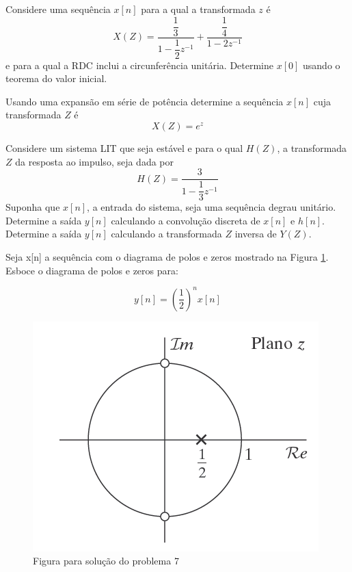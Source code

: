 \documentclass[12pt,a4paper]{article}
\begin{document}
\answer

\problem Considere uma sequência $x[n]$ para a qual a transformada
$z$ é
\begin{equation}
    X(Z) = \dfrac{\dfrac{1}{3}}{1 - \dfrac{1}{2}z^{-1}} + \dfrac{\dfrac{1}{4}}{1 - 2z^{-1}}
\end{equation}
e para a qual a RDC inclui a circunferência unitária. Determine
$x[0]$ usando o teorema do valor inicial.

\answer

\problem Usando uma expansão em série de potência determine a sequência $x[n]$ cuja transformada $Z$ é
\begin{equation}
X(Z) = e^{z}    
\end{equation}

\answer

\problem Considere um sistema LIT que seja estável e para o
qual $H(Z)$, a transformada $Z$ da resposta ao impulso,
seja dada por
\begin{equation}
    H(Z) = \dfrac{3}{1 - \dfrac{1}{3}z^{-1}}
\end{equation}
Suponha que $x[n]$, a entrada do sistema, seja uma sequência
degrau unitário.
\subproblem Determine a saída $y[n]$ calculando a convolução
discreta de $x[n]$ e $h[n]$.
\subproblem Determine a saída $y[n]$ calculando a transformada
$Z$ inversa de $Y(Z)$.

\answer

\problem Seja x[n] a sequência com o diagrama de polos e zeros
mostrado na Figura \ref{fig7}. Esboce o diagrama de polos e zeros para:

\begin{equation}
    y[n] = \left(\dfrac{1}{2}\right)^n x[n]
\end{equation}
\begin{figure}[h!]
    \centering
    \includegraphics[scale=0.6]{Fig/fig7.png}
    \caption{Figura para solução do problema 7}
    \label{fig7}
\end{figure}
\end{document}
